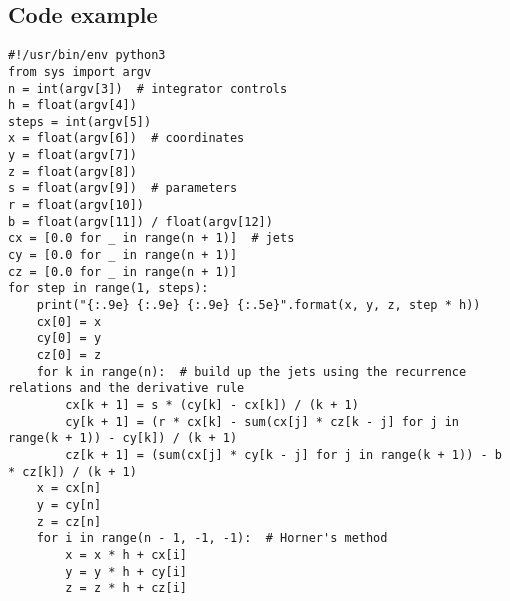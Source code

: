 \documentclass[11pt]{article}
\begin{document}
\subsection{Code example}
\begin{verbatim}
#!/usr/bin/env python3
from sys import argv
n = int(argv[3])  # integrator controls
h = float(argv[4])
steps = int(argv[5])
x = float(argv[6])  # coordinates
y = float(argv[7])
z = float(argv[8])
s = float(argv[9])  # parameters
r = float(argv[10])
b = float(argv[11]) / float(argv[12])
cx = [0.0 for _ in range(n + 1)]  # jets
cy = [0.0 for _ in range(n + 1)]
cz = [0.0 for _ in range(n + 1)]
for step in range(1, steps):
    print("{:.9e} {:.9e} {:.9e} {:.5e}".format(x, y, z, step * h))
    cx[0] = x
    cy[0] = y
    cz[0] = z
    for k in range(n):  # build up the jets using the recurrence relations and the derivative rule
        cx[k + 1] = s * (cy[k] - cx[k]) / (k + 1)
        cy[k + 1] = (r * cx[k] - sum(cx[j] * cz[k - j] for j in range(k + 1)) - cy[k]) / (k + 1)
        cz[k + 1] = (sum(cx[j] * cy[k - j] for j in range(k + 1)) - b * cz[k]) / (k + 1)
    x = cx[n]
    y = cy[n]
    z = cz[n]
    for i in range(n - 1, -1, -1):  # Horner's method
        x = x * h + cx[i]
        y = y * h + cy[i]
        z = z * h + cz[i]
\end{verbatim}
\end{document}
